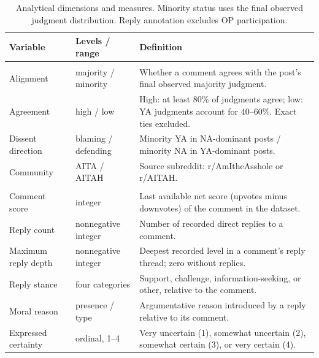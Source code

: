 \begin{table}[t]
  \centering
  \small
  \begin{tabular}{@{}p{}p{}p{}@{}}
    \toprule
    Variable & Levels / range & Definition \\
    \midrule
    \rowcolor{gray!15}
    \multicolumn{3}{@{}l}{\emph{Analytical dimensions}} \\
    \addlinespace[2pt]
    Alignment & majority / minority & Whether a comment agrees with the post's final observed majority judgment. \\
    Agreement & {high / low} & High: at least 80\% of judgments agree; low: YA judgments account for 40--60\%. Exact ties excluded. \\
    Dissent direction & blaming / defending & Minority YA in NA-dominant posts / minority NA in YA-dominant posts. \\
    Community & AITA / AITAH & Source subreddit:  r/AmItheAsshole or r/AITAH. \\
    \midrule
    \rowcolor{gray!15}
    \multicolumn{3}{@{}l}{\emph{Measures}} \\
    \addlinespace[2pt]
    Comment score & integer & Last available net score (upvotes minus downvotes) of the comment in the dataset. \\
    Reply count & nonnegative integer & Number of recorded direct replies to a comment. \\
    Maximum reply depth & nonnegative integer & Deepest recorded level in a comment's reply thread; zero without replies. \\
    Reply stance & four categories & Support, challenge, information-seeking, or other, relative to the comment. \\
    Moral reason & presence / type & Argumentative reason introduced by a reply relative to its comment. \\
    Expressed certainty & ordinal, 1--4 & Very uncertain (1), somewhat uncertain (2), somewhat certain (3), or very certain (4). \\
    \bottomrule
  \end{tabular}
  \caption{Analytical dimensions and measures.
  Minority status uses the final observed judgment distribution.
  Reply annotation excludes OP participation.}
  \vspace{-20pt}
  \label{tab:dimensions}
\end{table}
